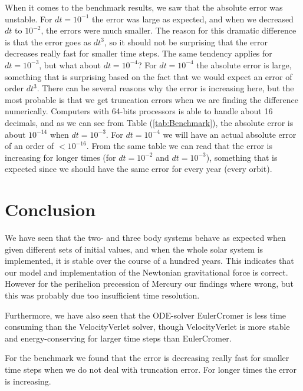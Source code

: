 \documentclass[norsk,a4paper,12pt]{article}
\begin{document}
{When it comes to the benchmark results, we saw that the absolute error was unstable. For $dt=10^{-1}$ the error was large as expected, and when we decreased $dt$ to $10^{-2}$, the errors were much smaller. The reason for this dramatic difference is that the error goes as $dt^3$, so it should not be surprising that the error decreases really fast for smaller time steps. The same tendency applies for $dt=10^{-3}$, but what about $dt=10^{-4}$? For $dt=10^{-4}$ the absolute error is large, something that is surprising based on the fact that we would expect an error of order $dt^3$. There can be several reasons why the error is increasing here, but the most probable is that we get truncation errors when we are finding the difference numerically. Computers with 64-bits processors is able to handle about 16 decimals, and as we can see from Table (\ref{tab:Benchmark}), the absolute error is about $10^{-14}$ when $dt=10^{-3}$. For $dt=10^{-4}$ we will have an actual absolute error of an order of $ <10^{-16}$. From the same table we can read that the error is increasing for longer times (for $dt=10^{-2}$ and $dt=10^{-3}$), something that is expected since we should have the same error for every year (every orbit). 
\section{Conclusion}
We have seen that the two- and three body systems behave as expected when given different sets of initial values, and when the whole solar system is implemented, it is stable over the course of a hundred years. This indicates that our model and implementation of the Newtonian gravitational force is correct. However for the perihelion precession of Mercury our findings where wrong, but this was probably due too insufficient time resolution. 

Furthermore, we have also seen that the ODE-solver EulerCromer is less time consuming than the VelocityVerlet solver, though VelocityVerlet is more stable and energy-conserving for larger time steps than EulerCromer.

For the benchmark we found that the error is decreasing really fast for smaller time steps when we do not deal with truncation error. For longer times the error is increasing. 
\newpage
}
\end{document}
